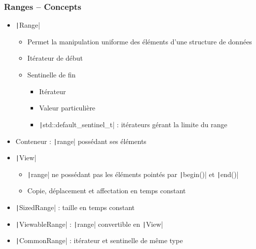\documentclass[C++.tex]{subfiles}
\begin{document}
\begin{frame}[fragile]
	\frametitle{Ranges -- Concepts}
	\begin{itemize}
		\item \texttt|Range|
		\begin{itemize}
			\item Permet la manipulation uniforme des éléments d'une structure de données
			\item Itérateur de début
			\item Sentinelle de fin
			\begin{itemize}
				\item Itérateur
				\item Valeur particulière
				\item \texttt|std::default_sentinel_t| : itérateurs gérant la limite du range

			\end{itemize}
		\end{itemize}

		\item Conteneur : \texttt|range| possédant ses éléments
		\item \texttt|View| 
		\begin{itemize}
			\item \texttt|range| ne possédant pas les éléments pointés par \texttt|begin()| et \texttt|end()|
			\item Copie, déplacement et affectation en temps constant
		\end{itemize}
		\item \texttt|SizedRange| : taille en temps constant
		\item \texttt|ViewableRange| : \texttt|range| convertible en \texttt|View|
		\item \texttt|CommonRange| : itérateur et sentinelle de même type
	\end{itemize}
\end{frame}
\end{document}
